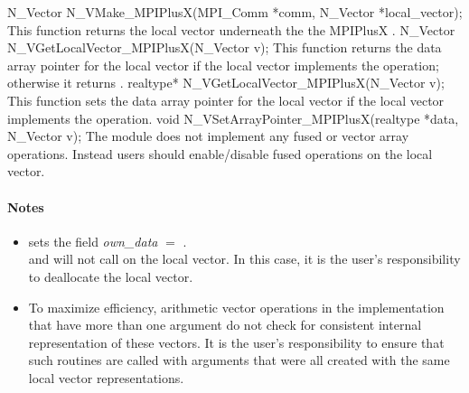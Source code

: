{
  N\_Vector N\_VMake\_MPIPlusX(MPI\_Comm *comm, 
  N\_Vector *local\_vector);
}
{
  This function returns the local vector underneath the 
  the MPIPlusX {\nvector}.
}
{
  N\_Vector N\_VGetLocalVector\_MPIPlusX(N\_Vector v);
}
{
  This function returns the data array pointer for the local vector
  if the local vector implements the  operation;
  otherwise it returns .
}
{
  realtype* N\_VGetLocalVector\_MPIPlusX(N\_Vector v);
}
{
  This function sets the data array pointer for the local vector
  if the local vector implements the  operation.
}
{
  void N\_VSetArrayPointer\_MPIPlusX(realtype *data, N\_Vector v);
}
The {\nvecmpiplusx} module does not implement any fused or vector array
operations. Instead users should enable/disable fused operations on the
local vector.
\paragraph{\bf Notes} 
           
\begin{itemize}
                                        
\item
  {\warn} sets the field {\em own\_data} $=$ . \\
  and  will not call  on the local
  vector. In this case, it is the user's responsibility to deallocate the local vector.

\item
  {\warn}To maximize efficiency, arithmetic vector operations in the
  {\nvecmpiplusx} implementation that have more than one
   argument do not check for consistent internal
  representation of these vectors. It is the user's responsibility to
  ensure that such routines are called with  arguments
  that were all created with the same local vector representations.

\end{itemize}

